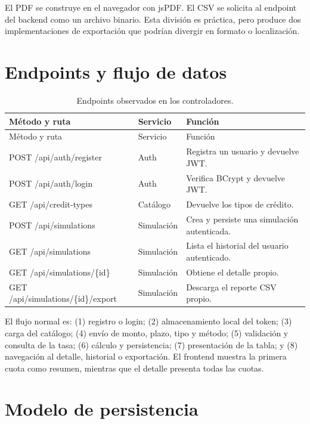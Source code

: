 \documentclass[12pt,a4paper]{article}
\begin{document}
El PDF se construye en el navegador con jsPDF. El CSV se solicita al endpoint
del backend como un archivo binario. Esta división es práctica, pero produce
dos implementaciones de exportación que podrían divergir en formato o
localización.

\section{Endpoints y flujo de datos}

\small
\begin{longtable}{>{\ttfamily}p{}p{}p{}}
\caption{Endpoints observados en los controladores.}\label{tab:endpoints}\\
\hline
\normalfont Método y ruta & \normalfont Servicio & \normalfont Función\\
\hline
\endfirsthead
\hline
\normalfont Método y ruta & \normalfont Servicio & \normalfont Función\\
\hline
\endhead
\textnormal{POST }/api/auth/register & Auth & Registra un usuario y devuelve JWT.\\
\textnormal{POST }/api/auth/login & Auth & Verifica BCrypt y devuelve JWT.\\
\textnormal{GET }/api/credit-types & Catálogo & Devuelve los tipos de crédito.\\
\textnormal{POST }/api/simulations & Simulación & Crea y persiste una simulación autenticada.\\
\textnormal{GET }/api/simulations & Simulación & Lista el historial del usuario autenticado.\\
\textnormal{GET }/api/simulations/\{id\} & Simulación & Obtiene el detalle propio.\\
\textnormal{GET }/api/simulations/\{id\}/export & Simulación & Descarga el reporte CSV propio.\\
\hline
\end{longtable}
\normalsize

El flujo normal es: (1) registro o login; (2) almacenamiento local del token;
(3) carga del catálogo; (4) envío de monto, plazo, tipo y método; (5)
validación y consulta de la tasa; (6) cálculo y persistencia; (7) presentación
de la tabla; y (8) navegación al detalle, historial o exportación. El
frontend muestra la primera cuota como resumen, mientras que el detalle
presenta todas las cuotas.

\section{Modelo de persistencia}
\end{document}

